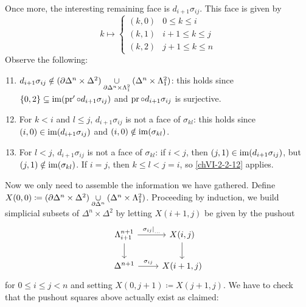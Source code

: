         Once more, the interesting remaining face is $d_{i+1} \sigma_{i j}$. This face is given by
        \begin{equation*}
            k \mapsto
            \begin{cases}
                (k, 0) & 0 \leq k \leq i \\
                (k, 1) & i + 1 \leq k \leq j \\
                (k, 2) & j + 1 \leq k \leq n
            \end{cases}
        \end{equation*}
        Observe the following:
        \begin{enumerate}[label=\arabic*)]
            \setcounter{enumi}{10}
            \item 
                $d_{i+1} \sigma_{i j} \notin (\partial \Delta^n \times \Delta^2) \underset{\partial \Delta^n \times \Lambda^{2}_{1}}{\cup} (\Delta^n \times \Lambda^{2}_{1})$: this holds since $\{ 0, 2 \} \subseteq \operatorname{im}(\operatorname{pr}' \circ d_{i+1} \sigma_{i j})$ and $\operatorname{pr} \circ d_{i+1} \sigma_{i j}$ is surjective.\label{chVI-2-2-11}
            \item 
                For $k < i$ and $l \leq j$, $d_{i+1} \sigma_{i j}$ is not a face of $\sigma_{k l}$: this holds since $(i, 0) \in \operatorname{im}(d_{i+1} \sigma_{i j})$ and $(i, 0) \notin \operatorname{im}(\sigma_{k l})$.\label{chVI-2-2-12}
            \item 
                For $l < j$, $d_{i+1} \sigma_{i j}$ is not a face of $\sigma_{k l}$: if $i < j$, then $(j, 1) \in \operatorname{im}(d_{i+1} \sigma_{i j})$, but $(j, 1) \notin \operatorname{im}(\sigma_{k l})$. If $i = j$, then $k \leq l < j = i$, so \ref{chVI-2-2-12} applies.\label{chVI-2-2-13} 
        \end{enumerate}
        Now we only need to assemble the information we have gathered. Define $X(0, 0) \coloneq (\partial \Delta^n \times \Delta^2) \underset{\partial \Delta^n}{\cup} (\Delta^n \times \Lambda^{2}_{1})$. Proceeding by induction, we build simplicial subsets of $\Delta^n \times \Delta^2$ by letting $X(i + 1, j)$ be given by the pushout
        \begin{equation*}
            \begin{tikzcd}
                \horn{n+1}{i+1} \arrow[d] \arrow[r, "{\sigma_{i j}|}_{\ldots}"] & X(i, j) \arrow[d] \\
                \Delta^{n+1} \arrow[r, "\sigma_{i j}"] & X(i + 1, j)
            \end{tikzcd}
        \end{equation*}
        for $0 \leq i \leq j < n$ and setting $X(0, j + 1) \coloneq X(j + 1, j)$. We have to check that the pushout squares above actually exist as claimed:
